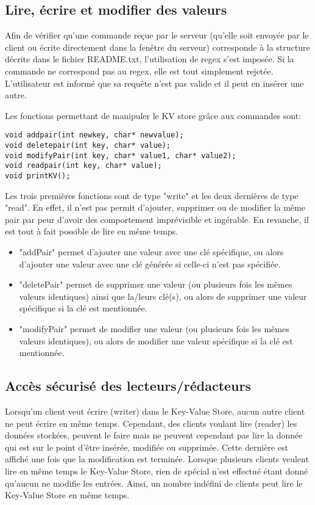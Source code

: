\documentclass[11pt,a4paper]{article}
\begin{document}
\subsection{Lire, écrire et modifier des valeurs}
Afin de vérifier qu'une commande reçue par le serveur (qu'elle soit envoyée par le client ou écrite directement dans la fenêtre du serveur) corresponde à la structure décrite dans le fichier README.txt, l'utilisation de regex s'est imposée. Si la commande ne correspond pas au regex, elle est tout simplement rejetée. L'utilisateur est informé que sa requête n'est pas valide et il peut en insérer une autre.

Les fonctions permettant de manipuler le KV store grâce aux commandes sont:
\begin{lstlisting}
void addpair(int newkey, char* newvalue);
void deletepair(int key, char* value);
void modifyPair(int key, char* value1, char* value2);
void readpair(int key, char* value);
void printKV();
\end{lstlisting}
Les trois premières fonctions sont de type "write" et les deux dernières de type "read". En effet, il n'est pas permit d'ajouter, supprimer ou de modifier la même pair par peur d'avoir des comportement imprévisible et ingérable. En revanche, il est tout à fait possible de lire en même temps.\\

\begin{itemize}
\item "addPair" permet d'ajouter une valeur avec une clé spécifique, ou alors d'ajouter une valeur avec une clé générée si celle-ci n'est pas spécifiée.
\item "deletePair" permet de supprimer une valeur (ou plusieurs fois les mêmes valeurs identiques) ainsi que la/leurs clé(s), ou alors de supprimer une valeur spécifique si la clé est mentionnée.
\item "modifyPair" permet de modifier une valeur (ou plusieurs fois les mêmes valeurs identiques), ou alors de modifier une valeur spécifique si la clé est mentionnée.
\end{itemize}


\subsection{Accès sécurisé des lecteurs/rédacteurs \cite{Mutex}}
Lorsqu'un client veut écrire (writer) dans le Key-Value Store, aucun autre client ne peut écrire en même temps. Cependant, des clients voulant lire (reader) les données stockées, peuvent le faire mais ne peuvent cependant pas lire la donnée qui est sur le point d'être insérée, modifiée ou supprimée. Cette dernière est affiché une fois que la modification est terminée. Lorsque plusieurs clients veulent lire en même temps le Key-Value Store, rien de spécial n'est effectué étant donné qu'aucun ne modifie les entrées. Ainsi, un nombre indéfini de clients peut lire le Key-Value Store en même temps.
\end{document}
